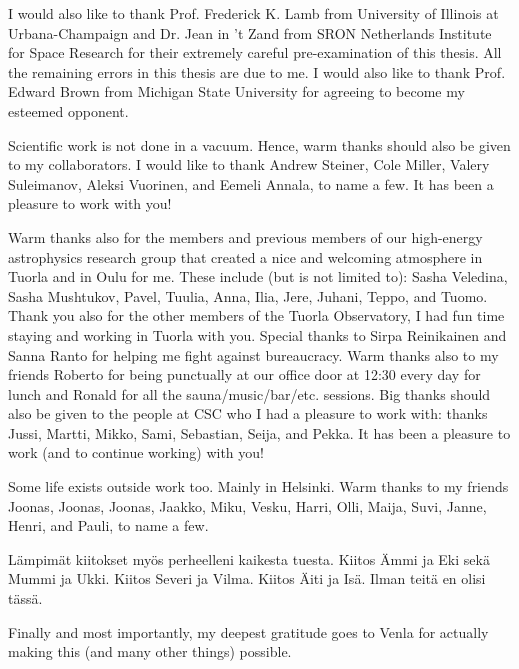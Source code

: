 I would also like to thank Prof. Frederick K. Lamb from University of Illinois at Urbana-Champaign and Dr. Jean in 't Zand from SRON Netherlands Institute for Space Research for their extremely careful pre-examination of this thesis.
All the remaining errors in this thesis are due to me.
I would also like to thank Prof. Edward Brown from Michigan State University for agreeing to become my esteemed opponent.

 
Scientific work is not done in a vacuum.
Hence, warm thanks should also be given to my collaborators.
I would like to thank Andrew Steiner, Cole Miller, Valery Suleimanov, Aleksi Vuorinen, and Eemeli Annala, to name a few.
It has been a pleasure to work with you!
 


 
Warm thanks also for the members and previous members of our high-energy astrophysics research group that created a nice and welcoming atmosphere in Tuorla and in Oulu for me.
These include (but is not limited to): Sasha Veledina, Sasha Mushtukov, Pavel, Tuulia, Anna, Ilia, Jere, Juhani, Teppo, and Tuomo.
Thank you also for the other members of the Tuorla Observatory, I had fun time staying and working in Tuorla with you.
Special thanks to Sirpa Reinikainen and Sanna Ranto for helping me fight against bureaucracy.
Warm thanks also to my friends Roberto for being punctually at our office door at 12:30 every day for lunch and Ronald for all the sauna/music/bar/etc. sessions.
Big thanks should also be given to the people at CSC who I had a pleasure to work with: 
thanks Jussi, Martti, Mikko, Sami, Sebastian, Seija, and Pekka. 
It has been a pleasure to work (and to continue working) with you!
 
 
 
Some life exists outside work too. 
Mainly in Helsinki.
Warm thanks to my friends Joonas, Joonas, Joonas, Jaakko, Miku, Vesku, Harri, Olli, Maija, Suvi, Janne, Henri, and Pauli, to name a few.


%
%

Lämpimät kiitokset myös perheelleni kaikesta tuesta.
Kiitos Ämmi ja Eki sekä Mummi ja Ukki. 
Kiitos Severi ja Vilma.
Kiitos Äiti ja Isä.
Ilman teitä en olisi tässä.

Finally and most importantly, my deepest gratitude goes to Venla for actually making this (and many other things) possible.
